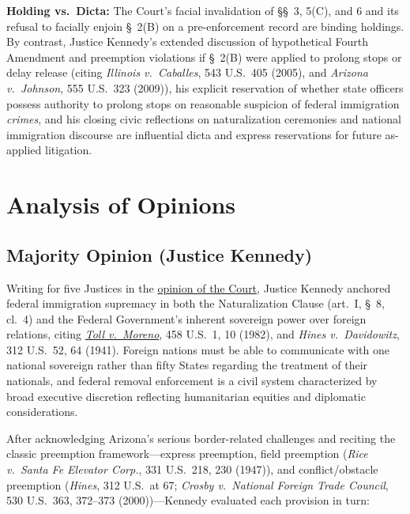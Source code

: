 \documentclass[12pt]{article}
\begin{document}
\textbf{Holding vs.\ Dicta:} The Court's facial invalidation of \S\S~3, 5(C), and 6 and its refusal to facially enjoin \S~2(B) on a pre-enforcement record are binding holdings. By contrast, Justice Kennedy's extended discussion of hypothetical Fourth Amendment and preemption violations if \S~2(B) were applied to prolong stops or delay release (citing \textit{Illinois v.\ Caballes}, 543 U.S.\ 405 (2005), and \textit{Arizona v.\ Johnson}, 555 U.S.\ 323 (2009)), his explicit reservation of whether state officers possess authority to prolong stops on reasonable suspicion of federal immigration \textit{crimes}, and his closing civic reflections on naturalization ceremonies and national immigration discourse are influential dicta and express reservations for future as-applied litigation.

\section{Analysis of Opinions}

\subsection{Majority Opinion (Justice Kennedy)}

Writing for five Justices in the \href{https://www.law.cornell.edu/supremecourt/text/11-182}{opinion of the Court}, Justice Kennedy anchored federal immigration supremacy in both the Naturalization Clause (art.\ I, \S~8, cl.\ 4) and the Federal Government's inherent sovereign power over foreign relations, citing \href{https://supreme.justia.com/cases/federal/us/458/1/}{\textit{Toll v.\ Moreno}}, 458 U.S.\ 1, 10 (1982), and \textit{Hines v.\ Davidowitz}, 312 U.S.\ 52, 64 (1941). Foreign nations must be able to communicate with one national sovereign rather than fifty States regarding the treatment of their nationals, and federal removal enforcement is a civil system characterized by broad executive discretion reflecting humanitarian equities and diplomatic considerations.

After acknowledging Arizona's serious border-related challenges and reciting the classic preemption framework---express preemption, field preemption (\textit{Rice v.\ Santa Fe Elevator Corp.}, 331 U.S.\ 218, 230 (1947)), and conflict/obstacle preemption (\textit{Hines}, 312 U.S.\ at 67; \textit{Crosby v.\ National Foreign Trade Council}, 530 U.S.\ 363, 372--373 (2000))---Kennedy evaluated each provision in turn:
\end{document}
